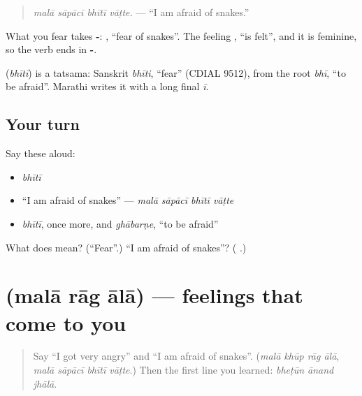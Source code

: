 \begin{quote}
\emph{malā sāpācī bhītī vāṭte.} — \textquotedblleft{}I am afraid of snakes.\textquotedblright{}
\end{quote}

What you fear takes \textbf{-}: \textbf{ }, \textquotedblleft{}fear of snakes\textquotedblright{}. The feeling \textbf{}, \textquotedblleft{}is felt\textquotedblright{}, and it is feminine, so the verb ends in \textbf{-}.

\begin{cousinweb}
\textbf{} (\emph{bhītī}) is a tatsama: Sanskrit \emph{bhīti}, \textquotedblleft{}fear\textquotedblright{} (CDIAL 9512), from the root \emph{bhī}, \textquotedblleft{}to be afraid\textquotedblright{}. Marathi writes it with a long final \emph{ī}.
\end{cousinweb}

\subsection*{Your turn}
Say these aloud:

\begin{itemize}
\raggedright
  \item \emph{bhītī}
  \item \textquotedblleft{}I am afraid of snakes\textquotedblright{} — \emph{malā sāpācī bhītī vāṭte}
  \item \emph{bhītī}, once more, and \emph{ghābarṇe}, \textquotedblleft{}to be afraid\textquotedblright{}
\end{itemize}

\begin{tcolorbox}[breakable,colback=teal!4,colframe=teal!35!black,title={Before you move on}]
What does \textbf{} mean? (\textquotedblleft{}Fear\textquotedblright{}.) \textquotedblleft{}I am afraid of snakes\textquotedblright{}? (\textbf{   }.)
\end{tcolorbox}
\section[\texorpdfstring{\mr{मला} \mr{राग} \mr{आला} (malā rāg ālā)}{मला राग आला (malā rāg ālā)}]{   (malā rāg ālā) — feelings that come to you}

\label{lesson:MR-C284-rag-ala}



\begin{quote}
Say \textquotedblleft{}I got very angry\textquotedblright{} and \textquotedblleft{}I am afraid of snakes\textquotedblright{}. (\emph{malā khūp rāg ālā}, \emph{malā sāpācī bhītī vāṭte}.) Then the first line you learned: \emph{bheṭūn ānand jhālā}.
\end{quote}

